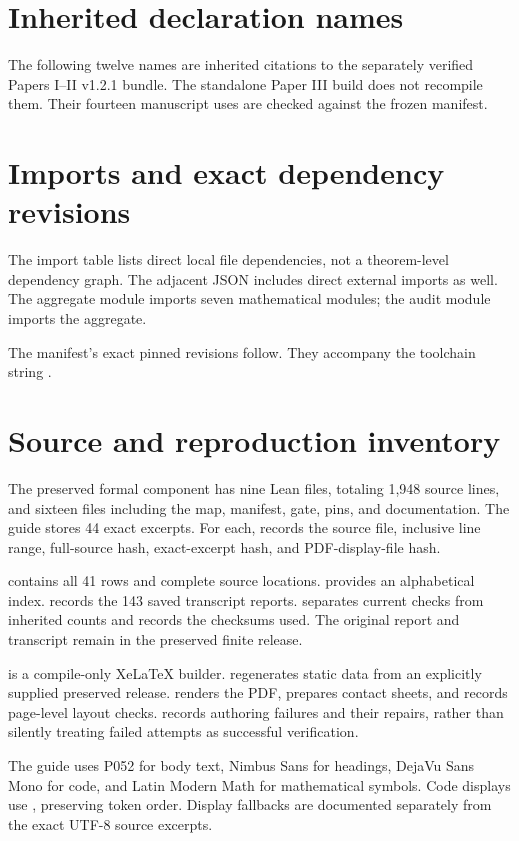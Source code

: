 \section{Inherited declaration names}\label{app:inherited}
The following twelve names are inherited citations to the separately verified Papers I--II v1.2.1 bundle. The standalone Paper III build does not recompile them. Their fourteen manuscript uses are checked against the frozen manifest.

\clearpage
\section{Imports and exact dependency revisions}
The import table lists direct local file dependencies, not a theorem-level dependency graph. The adjacent JSON includes direct external imports as well. The aggregate module imports seven mathematical modules; the audit module imports the aggregate.

The manifest's exact pinned revisions follow. They accompany the toolchain string .

\clearpage
\section{Source and reproduction inventory}
The preserved formal component has nine Lean files, totaling 1,948 source lines, and sixteen files including the map, manifest, gate, pins, and documentation. The guide stores 44 exact excerpts. For each,  records the source file, inclusive line range, full-source hash, exact-excerpt hash, and PDF-display-file hash.

 contains all 41 rows and complete source locations.  provides an alphabetical index.  records the 143 saved transcript reports.  separates current checks from inherited counts and records the checksums used. The original report and transcript remain in the preserved finite release.

 is a compile-only XeLaTeX builder.  regenerates static data from an explicitly supplied preserved release.  renders the PDF, prepares contact sheets, and records page-level layout checks.  records authoring failures and their repairs, rather than silently treating failed attempts as successful verification.

The guide uses P052 for body text, Nimbus Sans for headings, DejaVu Sans Mono for code, and Latin Modern Math for mathematical symbols. Code displays use , preserving token order. Display fallbacks are documented separately from the exact UTF-8 source excerpts.

